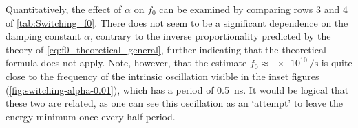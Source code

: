 \documentclass[11pt,a4paper,english]{article}
\begin{document}
Quantitatively, the effect of $\alpha$ on $f_0$ can be examined by comparing rows 3 and 4 of \cref{tab:Switching_f0}. There does not seem to be a significant dependence on the damping constant $\alpha$, contrary to the inverse proportionality predicted by the theory of \cref{eq:f0_theoretical_general}, further indicating that the theoretical formula does not apply. Note, however, that the estimate $f_0\approx\SI{e10}{\per\second}$ is quite close to the frequency of the intrinsic oscillation visible in the inset figures (\cref{fig:switching-alpha-0.01}), which has a period of \SI{0.5}{\nano\second}. It would be logical that these two are related, as one can see this oscillation as an `attempt' to leave the energy minimum once every half-period. 
\end{document}
